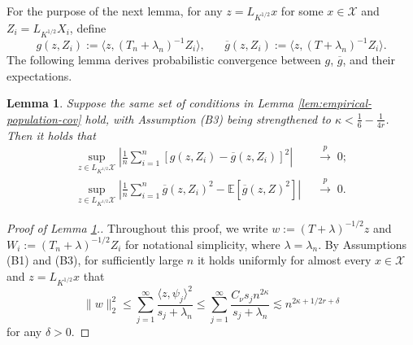 \documentclass[aos]{imsart}
\renewcommand{\bar}{\overline}
\newcommand{\mX}{\mathcal X}
\newcommand{\pd}[1]{%
	{ \color{blue} PD: #1}%
}
\theoremstyle{plain}
\newtheorem{lemma}{Lemma}[section]
\theoremstyle{definition}
\theoremstyle{definition}
\begin{document}
\begin{appendix}
For the purpose of the next lemma, for any $z=L_{K^{1/2}}x$ for some $x\in\mathcal X$ and $Z_i=L_{K^{1/2}}X_i$, define
$$
g(z,Z_i) := \langle z, (T_n+\lambda_n)^{-1}Z_i\rangle,\;\;\;\;\;\;\bar g(z,Z_i) := \langle z, (T+\lambda_n)^{-1}Z_i\rangle.
$$
The following lemma derives probabilistic convergence between $g$, $\bar g$, and their expectations.
\begin{lemma}
Suppose the same set of conditions in Lemma \ref{lem:empirical-population-cov} hold, with Assumption (B3) being strengthened to $\kappa<\frac{1}{6}-\frac{1}{4r}$. 
Then it holds that
\begin{align*}
\sup_{z\in L_{K^{1/2}}\mX}\left|\frac{1}{n}\sum_{i=1}^n [g(z,Z_i)-\bar g(z,Z_i)]^2\right|\;\;&\overset{p}{\to}\;0;\\
\sup_{z\in L_{K^{1/2}}\mX}\left|\frac{1}{n}\sum_{i=1}^n \bar g(z,Z_i)^2-\mathbb E[\bar g(z,Z)^2]\right|\;\;&\overset{p}{\to}\; 0.
\end{align*}
\label{lem:gdiff}
\end{lemma}
\begin{proof}[Proof of Lemma \ref{lem:gdiff}.]
Throughout this proof, we write $w := (T+\lambda)^{-1/2} z$ and $W_i := (T_n+\lambda)^{-1/2}Z_i$ for notational simplicity, where $\lambda=\lambda_n$.
By Assumptions (B1) and (B3), for sufficiently large $n$ it holds uniformly for almost every $x\in\mX$ and $z=L_{K^{1/2}}x$ that
\begin{equation}
\|w\|_2^2 \leq \sum_{j=1}^{\infty} \frac{\langle z,\psi_j\rangle^2}{s_j+\lambda_n} \leq \sum_{j=1}^{\infty}\frac{C_\nu s_j n^{2\kappa}}{s_j+\lambda_n} \lesssim n^{2\kappa+1/2r+\delta}
\label{eq:proof-gdiff-0}
\end{equation}
for any $\delta>0$. 


\end{proof}
\end{appendix}
\end{document}
